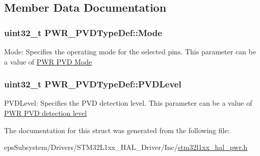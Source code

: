 \subsection{Member Data Documentation}
\hypertarget{struct_p_w_r___p_v_d_type_def_af692d691f0cb5871b319fd371fab34d8}{
\subsubsection[{Mode}]{\setlength{\rightskip}{0pt plus 5cm}uint32\-\_\-t P\-W\-R\-\_\-\-P\-V\-D\-Type\-Def\-::\-Mode}}\label{struct_p_w_r___p_v_d_type_def_af692d691f0cb5871b319fd371fab34d8}
Mode\-: Specifies the operating mode for the selected pins. This parameter can be a value of \hyperlink{group___p_w_r___p_v_d___mode}{P\-W\-R P\-V\-D Mode} \hypertarget{struct_p_w_r___p_v_d_type_def_a540471bc6ac947fd8bc2c87f61d9faab}{
\subsubsection[{P\-V\-D\-Level}]{\setlength{\rightskip}{0pt plus 5cm}uint32\-\_\-t P\-W\-R\-\_\-\-P\-V\-D\-Type\-Def\-::\-P\-V\-D\-Level}}\label{struct_p_w_r___p_v_d_type_def_a540471bc6ac947fd8bc2c87f61d9faab}
P\-V\-D\-Level\-: Specifies the P\-V\-D detection level. This parameter can be a value of \hyperlink{group___p_w_r___p_v_d__detection__level}{P\-W\-R P\-V\-D detection level} 

The documentation for this struct was generated from the following file\-:\begin{DoxyCompactItemize}
\item 
eps\-Subsystem/\-Drivers/\-S\-T\-M32\-L1xx\-\_\-\-H\-A\-L\-\_\-\-Driver/\-Inc/\hyperlink{stm32l1xx__hal__pwr_8h}{stm32l1xx\-\_\-hal\-\_\-pwr.\-h}\end{DoxyCompactItemize}
